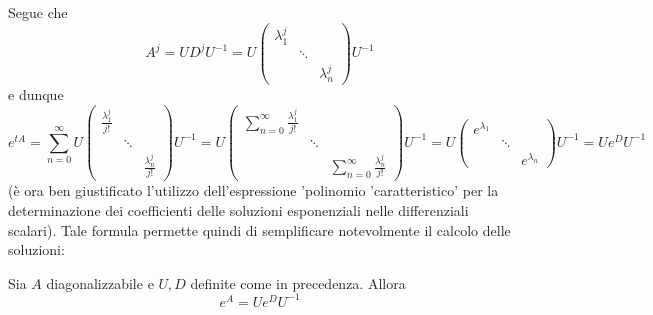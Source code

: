 \documentclass[10pt, oneside]{book}
\theoremstyle{plain}
\begin{document}
Segue che
\[A^j = U D^j U^{-1} = U \begin{pmatrix}
\lambda_1^j &  & \\
& \ddots & \\
& & \lambda_n^j
\end{pmatrix} U^{-1}\]
e dunque
\[e^{tA} = \sum\limits_{n=0}^\infty U \begin{pmatrix}
\displaystyle \frac{\lambda_1^j}{j!} &  & \\
& \ddots & \\
& & \displaystyle \frac{\lambda_n^j}{j!}
\end{pmatrix} U^{-1} = U \begin{pmatrix}
\displaystyle \sum\limits_{n=0}^\infty \frac{\lambda_1^j}{j!} &  & \\
& \ddots & \\
& & \displaystyle \sum\limits_{n=0}^\infty \frac{\lambda_n^j}{j!}
\end{pmatrix}U^{-1} = U \begin{pmatrix}
\displaystyle e^{\lambda_1} &  & \\
& \ddots & \\
& & \displaystyle e^{\lambda_n}
\end{pmatrix}U^{-1} = U e^D U^{-1}\]
(è ora ben giustificato l'utilizzo dell'espressione 'polinomio 'caratteristico' per la determinazione dei coefficienti delle soluzioni esponenziali nelle differenziali scalari). Tale formula permette quindi di semplificare notevolmente il calcolo delle soluzioni:
\begin{lem}
	Sia $A$ diagonalizzabile e $U, D$ definite come in precedenza. Allora
	\[e^A = U e^D U^{-1}\]
\end{lem}
\end{document}
